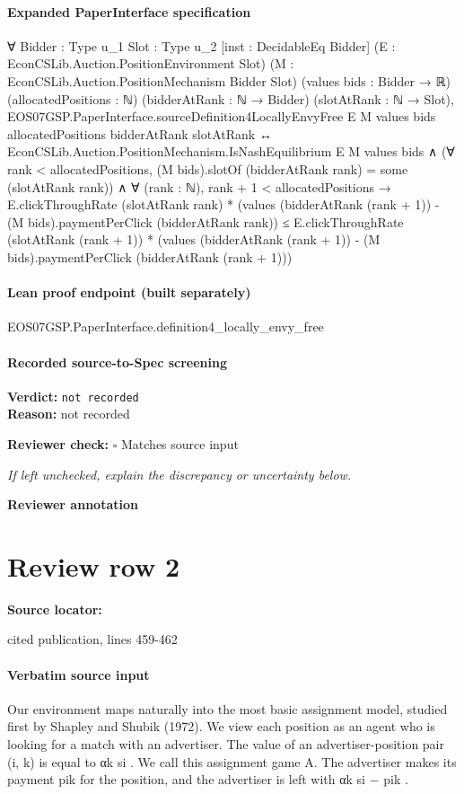 \documentclass[10pt]{article}
\newcommand{\reviewerbox}{%
  \par\noindent\fbox{\parbox{0.96\linewidth}{\rule{0pt}{0.38in}}}\par
}
\newcommand{\reviewmatch}[1]{%
  \par\noindent\textbf{Reviewer check:} $\square$\; #1\par
  \noindent\emph{If left unchecked, explain the discrepancy or uncertainty below.}\par
}
\begin{document}
\paragraph{Expanded PaperInterface specification}
\begin{ReviewVerbatim}
∀ {Bidder : Type u_1} {Slot : Type u_2} [inst : DecidableEq Bidder] (E : EconCSLib.Auction.PositionEnvironment Slot)
  (M : EconCSLib.Auction.PositionMechanism Bidder Slot) (values bids : Bidder → ℝ) (allocatedPositions : ℕ)
  (bidderAtRank : ℕ → Bidder) (slotAtRank : ℕ → Slot),
  EOS07GSP.PaperInterface.sourceDefinition4LocallyEnvyFree E M values bids allocatedPositions bidderAtRank slotAtRank ↔
    EconCSLib.Auction.PositionMechanism.IsNashEquilibrium E M values bids ∧
      (∀ rank < allocatedPositions, (M bids).slotOf (bidderAtRank rank) = some (slotAtRank rank)) ∧
        ∀ (rank : ℕ),
          rank + 1 < allocatedPositions →
            E.clickThroughRate (slotAtRank rank) *
                (values (bidderAtRank (rank + 1)) - (M bids).paymentPerClick (bidderAtRank rank)) ≤
              E.clickThroughRate (slotAtRank (rank + 1)) *
                (values (bidderAtRank (rank + 1)) - (M bids).paymentPerClick (bidderAtRank (rank + 1)))
\end{ReviewVerbatim}

\paragraph{Lean proof endpoint (built separately)}\begin{ReviewVerbatim}
EOS07GSP.PaperInterface.definition4_locally_envy_free
\end{ReviewVerbatim}

\paragraph{Recorded source-to-Spec screening}
\textbf{Verdict:} \texttt{not recorded}
\\
\textbf{Reason:} not recorded
\reviewmatch{Matches source input}
\noindent\textbf{Reviewer annotation}\par
\reviewerbox
\clearpage
\hypertarget{source-claim-ce8f50923b43bde9}{}
\section*{Review row 2}
\textbf{Source locator:} {\footnotesize\raggedright cited publication, lines 459-\allowbreak{}462\par}
\paragraph{Verbatim source input}
\begin{ReviewVerbatim}
Our environment maps naturally into the most basic assignment model, studied first by Shapley
and Shubik (1972). We view each position as an agent who is looking for a match with an advertiser.
The value of an advertiser-position pair (i, k) is equal to αk si . We call this assignment game A.
The advertiser makes its payment pik for the position, and the advertiser is left with αk si − pik .
\end{ReviewVerbatim}
\end{document}
